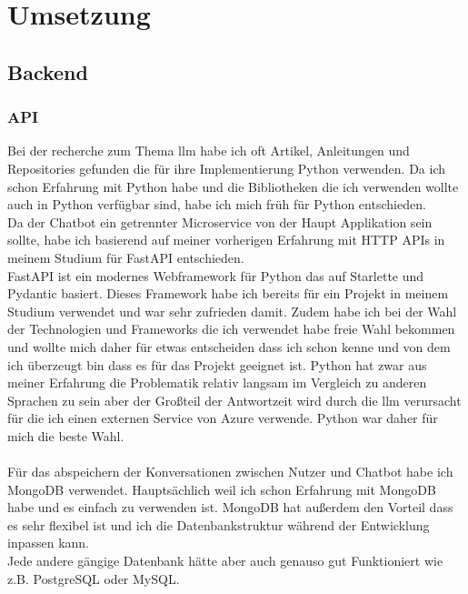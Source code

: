 \chapter{Umsetzung}\label{ch:umsetzung}
\section{Backend}\label{sec:umsetzung_backend}
\subsection{API}\label{sec:umsetzung_api}
Bei der recherche zum Thema \gls{llm} habe ich oft Artikel, Anleitungen und Repositories gefunden die für ihre Implementierung Python verwenden.
Da ich schon Erfahrung mit Python habe und die Bibliotheken die ich verwenden wollte auch in Python verfügbar sind, habe ich mich früh für Python entschieden.\\
Da der Chatbot ein getrennter Microservice von der Haupt Applikation sein sollte, habe ich basierend auf meiner vorherigen Erfahrung mit HTTP APIs in meinem Studium für FastAPI entschieden.\\
FastAPI ist ein modernes Webframework für Python das auf Starlette und Pydantic basiert. 
Dieses Framework habe ich bereits für ein Projekt in meinem Studium verwendet und war sehr zufrieden damit.
Zudem habe ich bei der Wahl der Technologien und Frameworks die ich verwendet habe freie Wahl bekommen und wollte
mich daher für etwas entscheiden dass ich schon kenne und von dem ich überzeugt bin dass es für das Projekt geeignet ist.
Python hat zwar aus meiner Erfahrung die Problematik relativ langsam im Vergleich zu anderen Sprachen zu sein aber der Großteil der Antwortzeit wird durch die \gls{llm} verursacht 
für die ich einen externen Service von Azure verwende. Python war daher für mich die beste Wahl.\\\\
Für das abspeichern der Konversationen zwischen Nutzer und Chatbot habe ich\\MongoDB verwendet. Hauptsächlich weil ich schon Erfahrung mit MongoDB habe und es einfach zu verwenden ist.
MongoDB hat außerdem den Vorteil dass es sehr flexibel ist und ich die Datenbankstruktur während der Entwicklung inpassen kann.\\
Jede andere gängige Datenbank hätte aber auch genauso gut Funktioniert wie z.B. PostgreSQL oder MySQL.\\

